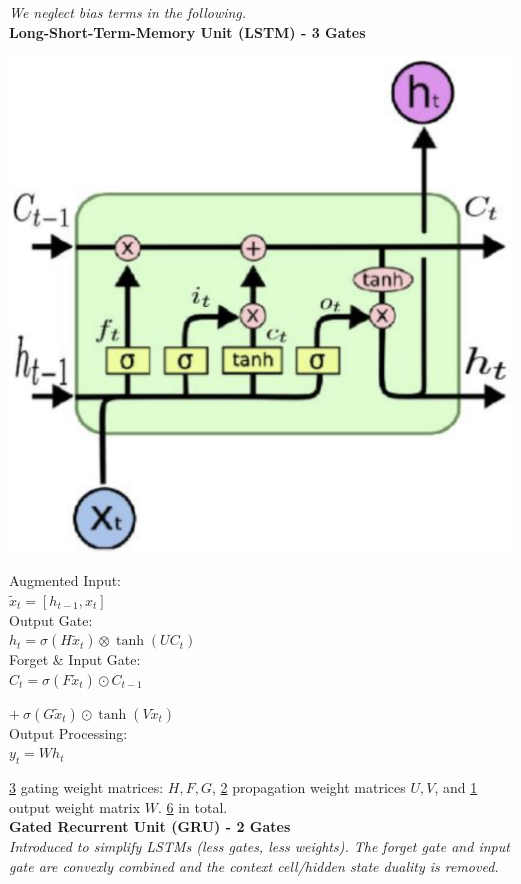 \textit{We neglect bias terms in the following.}\\
\textbf{Long-Short-Term-Memory Unit (LSTM) - 3 Gates}\\
\begin{minipage}{0.5\linewidth}
\includegraphics[width=\linewidth]{lstm_cell.png}
\end{minipage}
\begin{minipage}{0.5\linewidth}
    Augmented Input:\\
    $\tilde{x}_t = [h_{t-1}, x_t]$\\

    Output Gate:\\
    $h_{t} = \sigma(H \tilde{x}_{t}) \otimes \tanh(U C_{t})$\\
    
    Forget \& Input Gate:\\
    $C_t = \sigma(F \tilde{x}_t) \odot C_{t-1}$
    
    \hspace{8pt} $+\ \sigma(G \tilde{x}_t) \odot \tanh(V \tilde{x}_t)$\\

    Output Processing:\\
    $y_t = W h_t$
\end{minipage}
\underline{3} gating weight matrices: $H, F, G$, \underline{2} propagation weight matrices $U,V$, and \underline{1} output weight matrix $W$. \underline{6} in total. \\
\textbf{Gated Recurrent Unit (GRU) - 2 Gates}\\
\textit{Introduced to simplify LSTMs (less gates, less weights). The forget gate and input gate are convexly combined and the context cell/hidden state duality is removed.}\\

